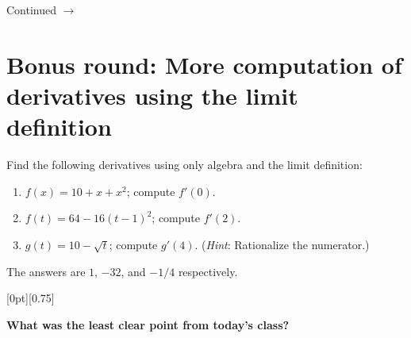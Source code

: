 \documentclass[11pt]{article}
\newcommand{\cuthere}{%
\noindent
\raisebox{-2.8pt}[0pt][0.75\baselineskip]{\small\ding{34}}
\unskip{\tiny\dotfill}
}
\def\ra{\rightarrow}
\def\pageturn{\vfill 
\begin{flushright}
	\begin{small}
		Continued $\ra$
	\end{small}
\end{flushright} \newpage}
\begin{document}
\pageturn

\section{Bonus round: More computation of derivatives using the limit definition}

Find the following derivatives using only algebra and the limit definition: 

\begin{enumerate}
	\item $f(x) = 10 + x + x^2$; compute $f'(0)$. 
	\item $f(t) = 64 - 16(t-1)^2$; compute $f'(2)$.
	\item $g(t) = 10 - \sqrt{t}$; compute $g'(4)$. (\emph{Hint}: Rationalize the numerator.)
\end{enumerate}

The answers are $1$, $-32$, and $-1/4$ respectively. 


\vfill

\cuthere

\noindent
\textbf{What was the least clear point from today's class?}

\vspace{1in}
\end{document}
